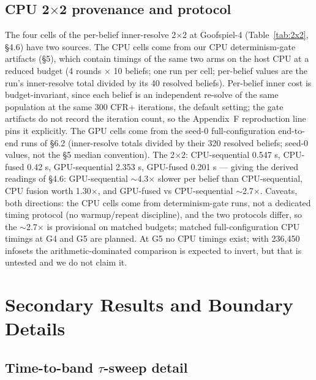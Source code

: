\documentclass[11pt]{article}
\begin{document}
\subsection{CPU \texorpdfstring{2$\times$2}{2x2} provenance and protocol}

The four cells of the per-belief inner-resolve 2$\times$2 at Goofspiel-4
(Table~\ref{tab:2x2}, \S4.6) have two sources. The CPU cells come from our CPU
determinism-gate artifacts (\S5), which contain timings of the same two arms on the host
CPU at a reduced budget (4 rounds $\times$ 10 beliefs; one run per cell; per-belief
values are the run's inner-resolve total divided by its 40 resolved beliefs). Per-belief
inner cost is budget-invariant, since each belief is an independent re-solve of the same
population at the same 300 CFR+ iterations, the default setting; the gate artifacts do
not record the iteration count, so the Appendix~F reproduction line pins it explicitly.
The GPU cells come from the seed-0 full-configuration end-to-end runs of \S6.2
(inner-resolve totals divided by their 320 resolved beliefs; seed-0 values, not the \S5
median convention). The 2$\times$2: CPU-sequential 0.547 s, CPU-fused 0.42 s,
GPU-sequential 2.353 s, GPU-fused 0.201 s --- giving the derived readings of \S4.6:
GPU-sequential $\sim$4.3$\times$ slower per belief than CPU-sequential, CPU fusion worth
1.30$\times$, and GPU-fused vs CPU-sequential $\sim$2.7$\times$. Caveats, both
directions: the CPU cells come from determinism-gate runs, not a dedicated timing
protocol (no warmup/repeat discipline), and the two protocols differ, so the
$\sim$2.7$\times$ is provisional on matched budgets; matched full-configuration CPU
timings at G4 and G5 are planned. At G5 no CPU timings exist; with 236,450 infosets the
arithmetic-dominated comparison is expected to invert, but that is untested and we do
not claim it.

\section{Secondary Results and Boundary Details}

\subsection{Time-to-band \texorpdfstring{$\tau$}{tau}-sweep detail}
\end{document}
